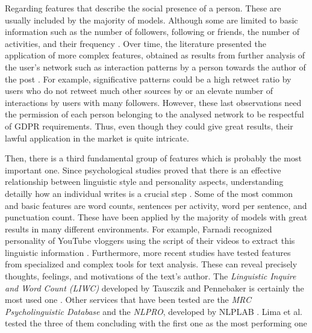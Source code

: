 Regarding features that describe the social presence of a person. These are usually included by the majority of models. Although some are limited to basic information such as the number of followers, following or friends, the number of activities, and their frequency \cite{quercia2011our}.
Over time, the literature presented the application of more complex features, obtained as results from further analysis of the user's network such as interaction patterns by a person towards the author of the post \cite{dickinson2015identifying}.
For example, significative patterns could be a high retweet ratio by users who do not retweet much other sources by or an elevate number of interactions by users with many followers. However, these last observations need the permission of each person belonging to the analysed network to be respectful of GDPR requirements. Thus, even though they could give great results, their lawful application in the market is quite intricate.

Then, there is a third fundamental group of features which is probably the most important one.
Since psychological studies proved that there is an effective relationship between linguistic style and personality aspects, understanding detailly how an individual writes is a crucial step \cite{pennebaker1999linguistic}.  
Some of the most common and basic features are word counts, sentences per activity, word per sentence, and punctuation count. These have been applied by the majority of models with great results in many different environments.
For example, Farnadi recognized personality of YouTube vloggers using the script of their videos to extract this linguistic information \cite{farnadi2014multivariate}.
Furthermore, more recent studies have tested features from specialized and complex tools for text analysis. These can reveal precisely thoughts, feelings, and motivations of the text's author.
The \emph{Linguistic Inquire and Word Count (LIWC)} developed by Tausczik and Pennebaker is certainly the most used one \cite{tausczik2010psychological}.
Other services that have been tested are the \emph{MRC Psycholinguistic Database} and the \emph{NLPRO}, developed by NLPLAB \cite{wilson1988mrc, tsarfaty2018natural}. Lima et al. tested the three of them concluding with the first one as the most performing one \cite{lima2019tecla}

